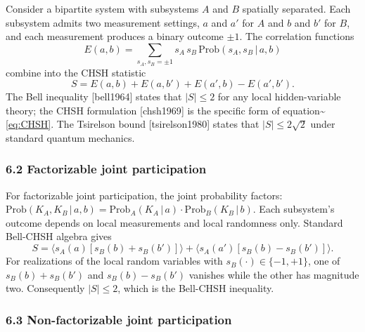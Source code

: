 \documentclass[
  11pt,
]{article}
\begin{document}
Consider a bipartite system with subsystems \(A\) and \(B\) spatially
separated. Each subsystem admits two measurement settings, \(a\) and
\(a'\) for \(A\) and \(b\) and \(b'\) for \(B\), and each measurement
produces a binary outcome \(\pm 1\). The correlation functions
\begin{equation}
  E(a,b) = \sum_{s_A, s_B = \pm 1} s_A \, s_B \, \mathrm{Prob}(s_A, s_B \,|\, a, b)
\end{equation} combine into the CHSH statistic \begin{equation}
  S = E(a,b) + E(a,b') + E(a',b) - E(a',b').
  \label{eq:CHSH}
\end{equation} The Bell inequality {[}bell1964{]} states that
\(|S| \leq 2\) for any local hidden-variable theory; the CHSH
formulation {[}chsh1969{]} is the specific form of
equation\textasciitilde{}\eqref{eq:CHSH}. The Tsirelson bound
{[}tsirelson1980{]} states that \(|S| \leq 2\sqrt{2}\) under standard
quantum mechanics.

\subsubsection{6.2 Factorizable joint
participation}\label{factorizable-joint-participation}

For factorizable joint participation, the joint probability factors:
\(\mathrm{Prob}(K_A, K_B \,|\, a, b) = \mathrm{Prob}_A(K_A \,|\, a) \cdot \mathrm{Prob}_B(K_B \,|\, b)\).
Each subsystem's outcome depends on local measurements and local
randomness only. Standard Bell-CHSH algebra gives \begin{equation}
  S = \langle s_A(a) [s_B(b) + s_B(b')] \rangle + \langle s_A(a') [s_B(b) - s_B(b')] \rangle.
\end{equation} For realizations of the local random variables with
\(s_B(\cdot) \in \{-1, +1\}\), one of \(s_B(b) + s_B(b')\) and
\(s_B(b) - s_B(b')\) vanishes while the other has magnitude two.
Consequently \(|S| \leq 2\), which is the Bell-CHSH inequality.

\subsubsection{6.3 Non-factorizable joint
participation}\label{non-factorizable-joint-participation}
\end{document}
